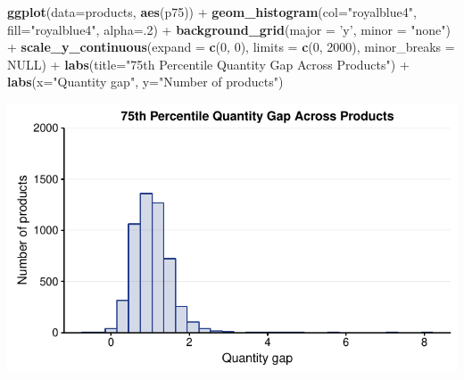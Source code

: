 \documentclass[10pt,]{article}
\newenvironment{Shaded}{\begin{snugshade}}{\end{snugshade}}
\newcommand{\KeywordTok}[1]{\textcolor[rgb]{0.13,0.29,0.53}{\textbf{{#1}}}}
\newcommand{\DataTypeTok}[1]{\textcolor[rgb]{0.13,0.29,0.53}{{#1}}}
\newcommand{\DecValTok}[1]{\textcolor[rgb]{0.00,0.00,0.81}{{#1}}}
\newcommand{\StringTok}[1]{\textcolor[rgb]{0.31,0.60,0.02}{{#1}}}
\newcommand{\OtherTok}[1]{\textcolor[rgb]{0.56,0.35,0.01}{{#1}}}
\newcommand{\NormalTok}[1]{{#1}}
\begin{document}
\begin{Shaded}
\begin{Highlighting}[]
\KeywordTok{ggplot}\NormalTok{(}\DataTypeTok{data=}\NormalTok{products, }\KeywordTok{aes}\NormalTok{(p75)) +}
\StringTok{  }\KeywordTok{geom_histogram}\NormalTok{(}\DataTypeTok{col=}\StringTok{"royalblue4"}\NormalTok{,}
                 \DataTypeTok{fill=}\StringTok{"royalblue4"}\NormalTok{,}
                 \DataTypeTok{alpha=}\NormalTok{.}\DecValTok{2}\NormalTok{) +}
\StringTok{  }\KeywordTok{background_grid}\NormalTok{(}\DataTypeTok{major =} \StringTok{'y'}\NormalTok{, }\DataTypeTok{minor =} \StringTok{"none"}\NormalTok{) +}
\StringTok{  }\KeywordTok{scale_y_continuous}\NormalTok{(}\DataTypeTok{expand =} \KeywordTok{c}\NormalTok{(}\DecValTok{0}\NormalTok{, }\DecValTok{0}\NormalTok{),  }\DataTypeTok{limits =} \KeywordTok{c}\NormalTok{(}\DecValTok{0}\NormalTok{, }\DecValTok{2000}\NormalTok{), }\DataTypeTok{minor_breaks =} \OtherTok{NULL}\NormalTok{) +}
\StringTok{  }\KeywordTok{labs}\NormalTok{(}\DataTypeTok{title=}\StringTok{"75th Percentile Quantity Gap Across Products"}\NormalTok{) +}
\StringTok{  }\KeywordTok{labs}\NormalTok{(}\DataTypeTok{x=}\StringTok{"Quantity gap"}\NormalTok{, }\DataTypeTok{y=}\StringTok{"Number of products"}\NormalTok{)}
\end{Highlighting}
\end{Shaded}

\begin{center}\includegraphics{Figs/qty_summary-5} \end{center}
\end{document}
